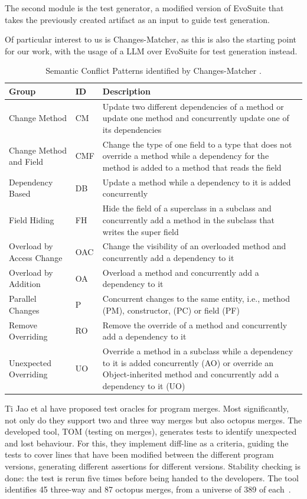 The second module is the test generator, a modified version of EvoSuite that takes the previously created artifact as an input to guide test generation.

Of particular interest to us is Changes-Matcher, as this is also the starting point for our work, with the usage of a LLM over EvoSuite for test generation instead.

\begin{table}[!h]
\setlength\extrarowheight{2pt}
\begin{tabularx}{\textwidth}{|l|l|X|}
 \hline
 Group & ID & Description \\ [0.5ex] 
 \hline\hline
 Change Method  & CM & Update two different dependencies of a method or update one method and concurrently update one of its
dependencies \\ 
 \hline
 Change Method
and Field & CMF & Change the type of one field to a type that does not
override a method while a dependency for the method
is added to a method that reads the field
 \\
 \hline
 Dependency
Based & DB & Update a method while a dependency to it is added
concurrently \\
 \hline
 Field Hiding & FH & Hide the field of a superclass in a subclass and concurrently add a method in the subclass that writes the
super field
 \\
 \hline
 Overload by Access Change & OAC & Change the visibility of an overloaded method and
concurrently add a dependency to it \\ 
 \hline
 Overload by Addition & OA & Overload a method and concurrently add a dependency to it \\  
 \hline
 Parallel Changes & P & Concurrent changes to the same entity, i.e., method
(PM), constructor, (PC) or field (PF) \\ 
 \hline
 Remove Overriding & RO & Remove the override of a method and concurrently
add a dependency to it \\  
  \hline
 Unexpected Overriding & UO & Override a method in a subclass while a dependency to it is added concurrently (AO) or override an
Object-inherited method and concurrently add a dependency to it (UO) \\ [1ex] 
 \hline
\end{tabularx}
\caption{\label{table:pattern-table}Semantic Conflict Patterns identified by Changes-Matcher \citep{kn:nuno}.}
\end{table}


Ti Jao et al have proposed test oracles for program merges. Most significantly, not only do they support two and three way merges but also octopus merges. The developed tool, TOM (testing on merges), generates tests to identify unexpected and lost behaviour. For this, they implement diff-line as a criteria, guiding the tests to cover lines that have been modified between the different program versions, generating different assertions for different versions. Stability checking is done: the test is rerun five times before being handed to the developers. The tool identifies 45 three-way and 87 octopus merges, from a universe of 389 of each~\citep{kn:ji2022}.

